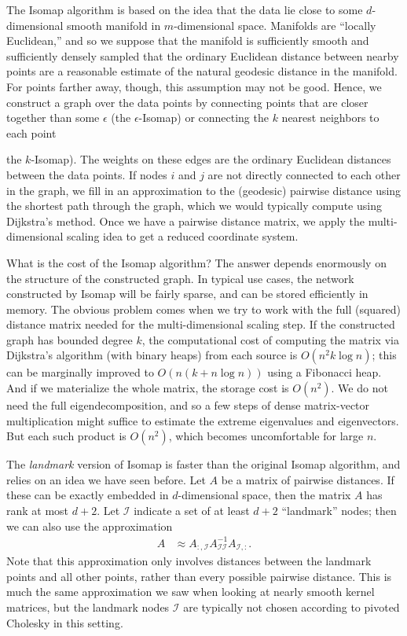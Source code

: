 \documentclass[12pt, leqno]{article} %
\begin{document}
The Isomap algorithm is based on the idea that the data lie close to
some $d$-dimensional smooth manifold in $m$-dimensional space.
Manifolds are ``locally Euclidean,'' and so we suppose that the
manifold is sufficiently smooth and sufficiently densely sampled
that the ordinary Euclidean distance between nearby points are a
reasonable estimate of the natural geodesic distance in the manifold.
For points farther away, though, this assumption may not be good.
Hence, we construct a graph over the data points by connecting points
that are closer together than some $\epsilon$ (the $\epsilon$-Isomap)
or connecting the $k$ nearest neighbors to each point {the $k$-Isomap).
The weights on these edges are the ordinary Euclidean distances
between the data points.  If nodes $i$ and $j$ are not directly
connected to each other in the graph, we fill in an approximation to the
(geodesic) pairwise distance using the shortest path through the
graph, which we would typically compute using Dijkstra's method.  Once
we have a pairwise distance matrix, we apply the multi-dimensional
scaling idea to get a reduced coordinate system.

What is the cost of the Isomap algorithm?  The answer depends
enormously on the structure of the constructed graph.  In typical use
cases, the network constructed by Isomap will be fairly sparse, and
can be stored efficiently in memory.  The obvious problem comes when
we try to work with the full (squared) distance matrix needed for the
multi-dimensional scaling step.  If the constructed graph has bounded
degree $k$, the computational cost of computing the matrix via
Dijkstra's algorithm (with binary heaps) from each source is
$O(n^2 k \log n)$; this can be marginally improved to $O(n(k + n \log n))$
using a Fibonacci heap.  And if we materialize the whole matrix, the
storage cost is $O(n^2)$.  We do not need the full eigendecomposition,
and so a few steps of dense matrix-vector multiplication might suffice
to estimate the extreme eigenvalues and eigenvectors.  But each such
product is $O(n^2)$, which becomes uncomfortable for large $n$.

The {\em landmark} version of Isomap is faster than the original
Isomap algorithm, and relies on an idea we have seen before.  Let $A$
be a matrix of pairwise distances.  If these can be exactly embedded
in $d$-dimensional space, then the matrix $A$ has rank at most $d+2$.
Let $\mathcal{I}$ indicate a set of at least $d+2$ ``landmark'' nodes;
then we can also use the approximation
\begin{align*}
  A
  & \approx
    A_{:,\mathcal{I}} A_{\mathcal{I} \mathcal{I}}^{-1} A_{\mathcal{I},:}.
\end{align*}
Note that this approximation only involves distances between the
landmark points and all other points, rather than every possible pairwise
distance.  This is much the same approximation we saw when looking at
nearly smooth kernel matrices, but the landmark nodes $\mathcal{I}$
are typically not chosen according to pivoted Cholesky in this setting.

}
\end{document}
